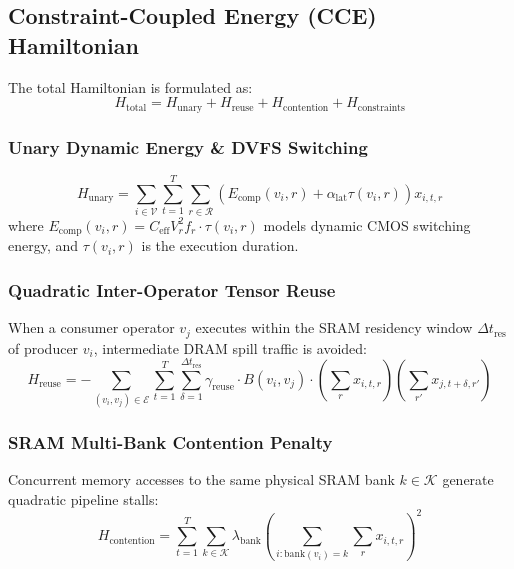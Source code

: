 \documentclass[journal]{IEEEtran}
\theoremstyle{definition}
\begin{document}
\subsection{Constraint-Coupled Energy (CCE) Hamiltonian}
The total Hamiltonian is formulated as:
\begin{equation}
H_{\text{total}} = H_{\text{unary}} + H_{\text{reuse}} + H_{\text{contention}} + H_{\text{constraints}}
\end{equation}

\subsubsection{Unary Dynamic Energy & DVFS Switching}
\begin{equation}
H_{\text{unary}} = \sum_{i \in \mathcal{V}} \sum_{t=1}^T \sum_{r \in \mathcal{R}} \left( E_{\text{comp}}(v_i, r) + \alpha_{\text{lat}} \tau(v_i, r) \right) x_{i,t,r}
\end{equation}
where $E_{\text{comp}}(v_i, r) = C_{\text{eff}} V_r^2 f_r \cdot \tau(v_i, r)$ models dynamic CMOS switching energy, and $\tau(v_i, r)$ is the execution duration.

\subsubsection{Quadratic Inter-Operator Tensor Reuse}
When a consumer operator $v_j$ executes within the SRAM residency window $\Delta t_{\text{res}}$ of producer $v_i$, intermediate DRAM spill traffic is avoided:
\begin{equation}
H_{\text{reuse}} = -\sum_{(v_i, v_j) \in \mathcal{E}} \sum_{t=1}^T \sum_{\delta=1}^{\Delta t_{\text{res}}} \gamma_{\text{reuse}} \cdot B(v_i, v_j) \cdot \left( \sum_r x_{i,t,r} \right) \left( \sum_{r'} x_{j,t+\delta,r'} \right)
\end{equation}

\subsubsection{SRAM Multi-Bank Contention Penalty}
Concurrent memory accesses to the same physical SRAM bank $k \in \mathcal{K}$ generate quadratic pipeline stalls:
\begin{equation}
H_{\text{contention}} = \sum_{t=1}^T \sum_{k \in \mathcal{K}} \lambda_{\text{bank}} \left( \sum_{i: \text{bank}(v_i)=k} \sum_r x_{i,t,r} \right)^2
\end{equation}
\end{document}
